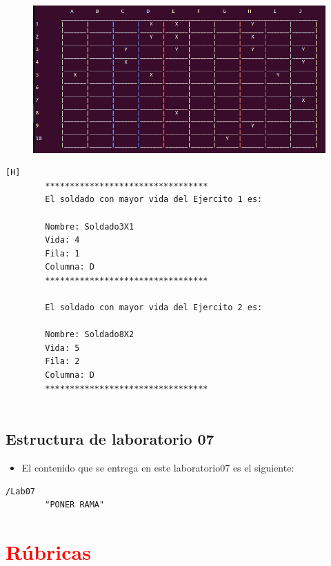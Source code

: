 \documentclass{article}
\begin{document}
	\begin{figure}[H]
		\centering
		\includegraphics[width=1.0\textwidth,keepaspectratio]{img/Commit6.png}
	\end{figure}
	\begin{lstlisting}[language=bash,caption={Ejecucion:}][H]
		*********************************
		El soldado con mayor vida del Ejercito 1 es: 
		
		Nombre: Soldado3X1
		Vida: 4
		Fila: 1
		Columna: D
		*********************************
		
		El soldado con mayor vida del Ejercito 2 es: 
		
		Nombre: Soldado8X2
		Vida: 5
		Fila: 2
		Columna: D
		*********************************
		
	\end{lstlisting}
	\subsection{Estructura de laboratorio 07}
	\begin{itemize}	
		\item El contenido que se entrega en este laboratorio07 es el siguiente:
	\end{itemize}
	\begin{lstlisting}[style=ascii-tree]
	/Lab07	
		"PONER RAMA"
	\end{lstlisting}    
	\section{\textcolor{red}{Rúbricas}}
	
\end{document}
